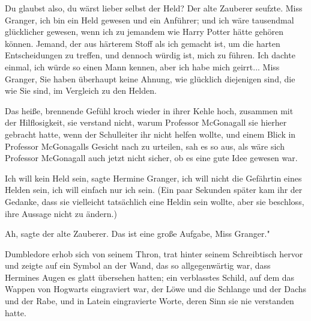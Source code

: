 \glqq Du glaubst also, du wärst lieber selbst der Held?\grqq{} Der alte Zauberer
seufzte. \glqq Miss Granger, ich bin ein Held gewesen und ein Anführer; und ich
wäre tausendmal glücklicher gewesen, wenn ich zu jemandem wie Harry Potter hätte
gehören können. Jemand, der aus härterem Stoff als ich gemacht ist, um die
harten Entscheidungen zu treffen, und dennoch würdig ist, mich zu führen. Ich
dachte einmal, ich würde so einen Mann kennen, aber ich habe mich geirrt... Miss
Granger, Sie haben überhaupt keine Ahnung, wie glücklich diejenigen sind, die
wie Sie sind, im Vergleich zu den Helden.\grqq{}

Das heiße, brennende Gefühl kroch wieder in ihrer Kehle hoch, zusammen mit der
Hilflosigkeit, sie verstand nicht, warum Professor McGonagall sie hierher
gebracht hatte, wenn der Schulleiter ihr nicht helfen wollte, und einem Blick in
Professor McGonagalls Gesicht nach zu urteilen, sah es so aus, als wäre sich
Professor McGonagall auch jetzt nicht sicher, ob es eine gute Idee gewesen war.

\glqq Ich will kein Held sein\grqq{}, sagte Hermine Granger, \glqq ich will
nicht die Gefährtin eines Helden sein, ich will einfach nur ich sein.\grqq{}
(Ein paar Sekunden später kam ihr der Gedanke, dass sie vielleicht tatsächlich
eine Heldin sein wollte, aber sie beschloss, ihre Aussage nicht zu ändern.)

\glqq Ah\grqq{}, sagte der alte Zauberer. \glqq Das ist eine große Aufgabe, Miss
Granger."

Dumbledore erhob sich von seinem Thron, trat hinter seinem Schreibtisch hervor
und zeigte auf ein Symbol an der Wand, das so allgegenwärtig war, dass Hermines
Augen es glatt übersehen hatten; ein verblasstes Schild, auf dem das Wappen von
Hogwarts eingraviert war, der Löwe und die Schlange und der Dachs und der Rabe,
und in Latein eingravierte Worte, deren Sinn sie nie verstanden hatte.


